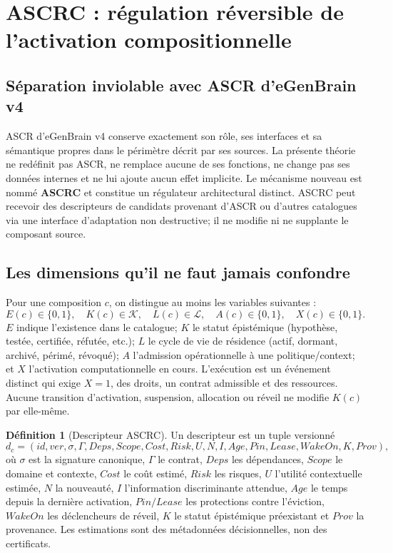 \documentclass[11pt,a4paper]{article}
\theoremstyle{definition}
\newtheorem{definition}{Définition}[section]
\theoremstyle{plain}
\theoremstyle{remark}
\begin{document}
\section{ASCRC : régulation réversible de l'activation compositionnelle}
\subsection{Séparation inviolable avec ASCR d'eGenBrain v4}
ASCR d'eGenBrain v4 conserve exactement son rôle, ses interfaces et sa sémantique propres dans le périmètre décrit par ses sources. La présente théorie ne redéfinit pas ASCR, ne remplace aucune de ses fonctions, ne change pas ses données internes et ne lui ajoute aucun effet implicite. Le mécanisme nouveau est nommé \textbf{ASCRC} et constitue un régulateur architectural distinct. ASCRC peut recevoir des descripteurs de candidats provenant d'ASCR ou d'autres catalogues via une interface d'adaptation non destructive; il ne modifie ni ne supplante le composant source.

\subsection{Les dimensions qu'il ne faut jamais confondre}
Pour une composition $c$, on distingue au moins les variables suivantes :
\[
E(c)\in\{0,1\},\quad K(c)\in\mathcal{K},\quad L(c)\in\mathcal{L},\quad A(c)\in\{0,1\},\quad X(c)\in\{0,1\}.
\]
$E$ indique l'existence dans le catalogue; $K$ le statut épistémique (hypothèse, testée, certifiée, réfutée, etc.); $L$ le cycle de vie de résidence (actif, dormant, archivé, périmé, révoqué); $A$ l'admission opérationnelle à une politique/context; et $X$ l'activation computationnelle en cours. L'exécution est un événement distinct qui exige $X=1$, des droits, un contrat admissible et des ressources. Aucune transition d'activation, suspension, allocation ou réveil ne modifie $K(c)$ par elle-même.

\begin{definition}[Descripteur ASCRC]
Un descripteur est un tuple versionné
\[
 d_c=(id,ver,\sigma,\Gamma,Deps,Scope,Cost,Risk,U,N,I,Age,Pin,Lease,WakeOn,K,Prov),
\]
où $\sigma$ est la signature canonique, $\Gamma$ le contrat, $Deps$ les dépendances, $Scope$ le domaine et contexte, $Cost$ le coût estimé, $Risk$ les risques, $U$ l'utilité contextuelle estimée, $N$ la nouveauté, $I$ l'information discriminante attendue, $Age$ le temps depuis la dernière activation, $Pin/Lease$ les protections contre l'éviction, $WakeOn$ les déclencheurs de réveil, $K$ le statut épistémique préexistant et $Prov$ la provenance. Les estimations sont des métadonnées décisionnelles, non des certificats.
\end{definition}
\end{document}
